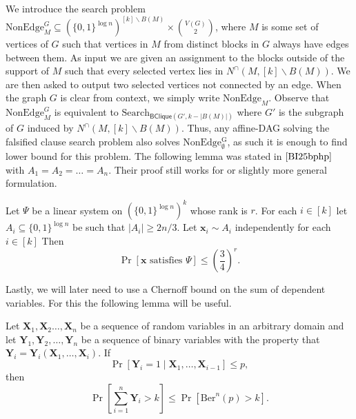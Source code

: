 \documentclass[10pt,a4paper]{article}
\theoremstyle{definition}
\theoremstyle{remark}
\theoremstyle{example}
\theoremstyle{plain}
\renewcommand{\setminus}{\smallsetminus}
\newcommand{\search}{\mathrm{Search}}
\newcommand{\binClique}[2]{\mathsf{BClique}({#1}, {#2})}
\begin{document}
We introduce the search problem $\mathrm{NonEdge}^G_M \subseteq (\{0,1\}^{\log n})^{[k]\setminus B(M)}\times \binom{V(G)}{2}$, where $M$ is some set of vertices of $G$ such that vertices in $M$ from distinct blocks in $G$ always have edges between them. As input we are given an assignment to the blocks outside of the support of $M$ such that every selected vertex lies in $N^\cap(M,[k]\setminus B(M))$. We are then asked to output two selected vertices not connected by an edge. When the graph $G$ is clear from context, we simply write $\mathrm{NonEdge}_M$. Observe that $\mathrm{NonEdge}_M^G$ is equivalent to $\search_{\binClique{G'}{k - |B(M)|}}$ where $G'$ is the subgraph of $G$ induced by $N^\cap(M,[k]\setminus B(M))$.  
Thus, any affine-DAG solving the falsified clause search problem also solves $\mathrm{NonEdge^G_\emptyset}$, as such it is enough to find lower bound for this problem. 
The following lemma was stated in $\cite{BI25bphp}$ with $A_1=A_2=\dots=A_n$. Their proof still works for or slightly more general formulation. 


\begin{lemma}
    \label{lemma:rank-probability-relation}
    Let $\Psi$ be a linear system on $(\{0,1\}^{\log n})^k$ whose rank is $r$. For each $i \in [k]$ let $A_i \subseteq \{0,1\}^{\log n}$ be such that $|A_i|\geq 2n/3$. Let $\bm x_i \sim A_i$ independently for each $i \in [k]$ Then \begin{equation*}
        \Pr[\bm x\textrm{ satisfies }\Psi] \leq \left(\frac{3}{4}\right)^r.
    \end{equation*} 
\end{lemma}

Lastly, we will later need to use a Chernoff bound on the sum of dependent variables.  For this the following lemma will be useful.

\begin{lemma}[{\cite[Lemma 17.3]{MU17}}]
\label{lemma:conditional-chernoff}
Let $\bm X_1,\bm X_2\dots,\bm X_n$ be a sequence of random variables in an arbitrary domain and let $\bm Y_1,\bm Y_2,\dots,\bm Y_n$ be a sequence of binary variables with the property that $\bm Y_i = \bm Y_i(\bm X_1,\dots,\bm X_i)$. If
\begin{equation*}
    \Pr[\bm Y_i =1\mid \bm X_1,\dots, \bm X_{i-1}] \leq p,
\end{equation*}
then 
\begin{equation*}
    \Pr\left[\sum_{i=1}^n \bm Y_i>k\right]\leq \Pr \left[\mathrm{Ber}^n(p)>k\right].
\end{equation*}
\end{lemma}
\end{document}
